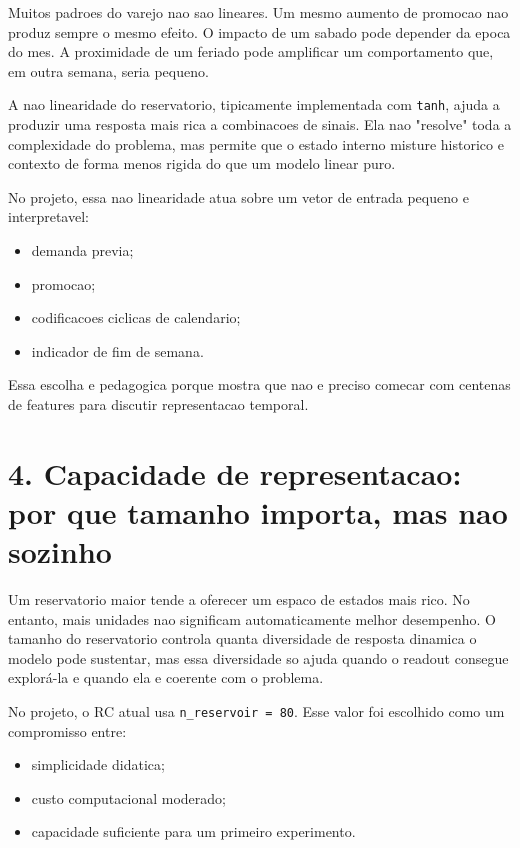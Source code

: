 \documentclass[12pt]{article}
\providecommand{\tightlist}{%
  \setlength{\itemsep}{0pt}\setlength{\parskip}{0pt}}
\begin{document}
Muitos padroes do varejo nao sao lineares. Um mesmo aumento de promocao nao produz sempre o mesmo efeito. O impacto de um sabado pode depender da epoca do mes. A proximidade de um feriado pode amplificar um comportamento que, em outra semana, seria pequeno.

A nao linearidade do reservatorio, tipicamente implementada com \texttt{tanh}, ajuda a produzir uma resposta mais rica a combinacoes de sinais. Ela nao "resolve" toda a complexidade do problema, mas permite que o estado interno misture historico e contexto de forma menos rigida do que um modelo linear puro.

No projeto, essa nao linearidade atua sobre um vetor de entrada pequeno e interpretavel:

\begin{itemize}
\tightlist
\item
  demanda previa;
\item
  promocao;
\item
  codificacoes ciclicas de calendario;
\item
  indicador de fim de semana.
\end{itemize}

Essa escolha e pedagogica porque mostra que nao e preciso comecar com centenas de features para discutir representacao temporal.

\section{4. Capacidade de representacao: por que tamanho importa, mas nao sozinho}\label{4-capacidade-de-representacao-por-que-tamanho-importa-mas-nao-sozinho}

Um reservatorio maior tende a oferecer um espaco de estados mais rico. No entanto, mais unidades nao significam automaticamente melhor desempenho. O tamanho do reservatorio controla quanta diversidade de resposta dinamica o modelo pode sustentar, mas essa diversidade so ajuda quando o readout consegue explorá-la e quando ela e coerente com o problema.

No projeto, o RC atual usa \texttt{n\_reservoir\ =\ 80}. Esse valor foi escolhido como um compromisso entre:

\begin{itemize}
\tightlist
\item
  simplicidade didatica;
\item
  custo computacional moderado;
\item
  capacidade suficiente para um primeiro experimento.
\end{itemize}
\end{document}
